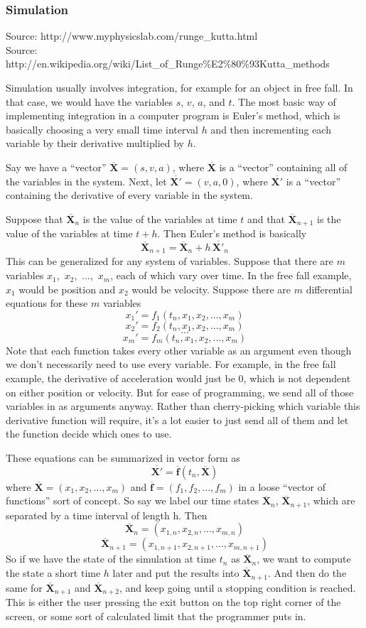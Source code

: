 \documentclass[12pt]{article}
\newcommand{\bfvec}[1]{\overline{\mathbf{#1}}}
\begin{document}
	\subsubsection*{Simulation}
	
	Source: http://www.myphysicslab.com/runge\_kutta.html \\
	Source: http://en.wikipedia.org/wiki/List\_of\_Runge\%E2\%80\%93Kutta\_methods
	
	Simulation usually involves integration, for example for an object in free fall. In that case, we would have the variables $s$, $v$, $a$, and $t$. The most basic way of implementing integration in a computer program is Euler's method, which is basically choosing a very small time interval $h$ and then incrementing each variable by their derivative multiplied by $h$.

	Say we have a ``vector'' $\bfvec{X} = (s, v, a)$, where $\bfvec{X}$ is a ``vector'' containing all of the variables in the system. Next, let $\bfvec{X'} = (v, a, 0)$, where $\bfvec{X'}$ is a ``vector'' containing the derivative of every variable in the system.

	Suppose that $\bfvec{X}_n$ is the value of the variables at time $t$ and that $\bfvec{X}_{n+1}$ is the value of the variables at time $t+h$. Then Euler's method is basically
			$$\bfvec{X}_{n+1} = \bfvec{X}_n + h\,\bfvec{X'}_n$$			
	This can be generalized for any system of variables. Suppose that there are $m$ variables $x_1$,~$x_2$,~...,~$x_m$, each of which vary over time. In the free fall example, $x_1$ would be position and $x_2$ would be velocity. Suppose there are $m$ differential equations for these $m$ variables
			$$x_1' = f_1(t_n, x_1,x_2,...,x_m)$$
			$$x_2' = f_2(t_n, x_1,x_2,...,x_m)$$
			$$...$$
			$$x_m' = f_m(t_n, x_1,x_2,...,x_m)$$
	Note that each function takes every other variable as an argument even though we don't necessarily need to use every variable. For example, in the free fall example, the derivative of acceleration would just be 0, which is not dependent on either position or velocity. But for ease of programming, we send all of those variables in as arguments anyway. Rather than cherry-picking which variable this derivative function will require, it's a lot easier to just send all of them and let the function decide which ones to use. 
	
	These equations can be summarized in vector form as
			$$\bfvec{X'} = \bfvec{f}(t_n, \bfvec{X})$$
	where $\bfvec{X} = (x_1,x_2,...,x_m)$ and $\bfvec{f}=(f_1,f_2,...,f_m)$ in a loose ``vector of functions'' sort of concept. So say we label our time states $\bfvec{X}_n$, $\bfvec{X}_{n+1}$, which are separated by a time interval of length h. Then
			$$\bfvec{X}_n = (x_{1,n}, x_{2,n}, ..., x_{m,n})$$
			$$\bfvec{X}_{n+1} = (x_{1,n+1}, x_{2,n+1}, ..., x_{m,n+1})$$
	So if we have the state of the simulation at time $t_n$ as $\bfvec{X}_n$, we want to compute the state a short time $h$ later and put the results into $\bfvec{X}_{n+1}$. And then do the same for $\bfvec{X}_{n+1}$ and $\bfvec{X}_{n+2}$, and keep going until a stopping condition is reached. This is either the user pressing the exit button on the top right corner of the screen, or some sort of calculated limit that the programmer puts in.
\end{document}
